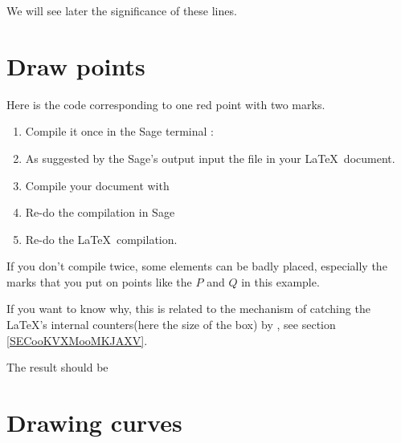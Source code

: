 We will see later the significance of these lines.

\section{Draw points}

Here is the code corresponding to one red point with two marks.



\begin{enumerate}
    \item
        
Compile it once in the Sage terminal :



\item

    As suggested by the Sage's output input the file  in your \LaTeX\ document.

\item

    Compile your document with 

\item
    Re-do the compilation in Sage
\item
    Re-do the \LaTeX\ compilation.
\end{enumerate}
If you don't compile twice, some elements can be badly placed, especially the marks that you put on points like the \( P\) and \( Q\) in this example.

If you want to know why, this is related to the mechanism of catching the \LaTeX's internal counters(here the size of the box) by \phystricks, see section \ref{SECooKVXMooMKJAXV}.

The result should be

\begin{center}
   
\end{center}

\section{Drawing curves}

